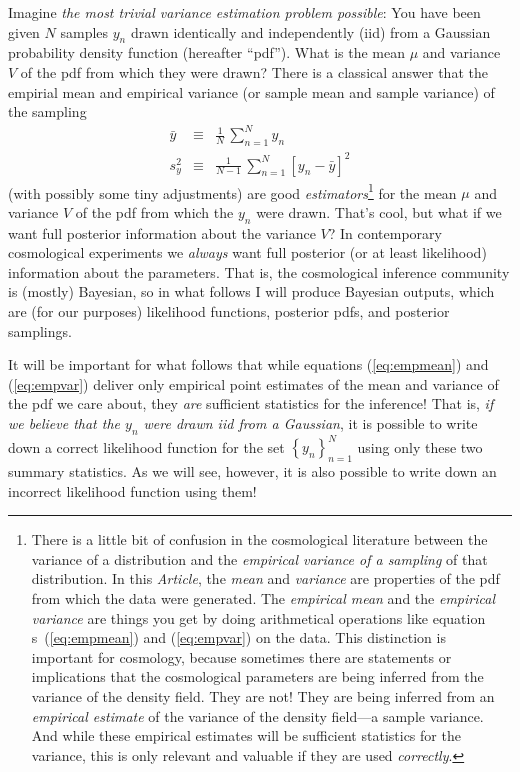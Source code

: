\documentclass[12pt, letterpaper, preprint]{aastex}
\newcommand{\setof}[1]{\left\{{#1}\right\}}
\newcommand{\documentname}{\textsl{Article}}
\newcommand{\equationname}{equation}
\begin{document}
Imagine \emph{the most trivial variance estimation problem possible}:
You have been given $N$ samples $y_n$ drawn identically and independently (iid)
from a Gaussian probability density function (hereafter ``pdf'').
What is the mean $\mu$ and variance $V$ of the pdf from which they
were drawn?
There is a classical answer that the empirial mean and empirical
variance (or sample mean and sample variance) of the sampling
\begin{eqnarray}
\bar{y} &\equiv& \frac{1}{N}\,\sum_{n=1}^N y_n
\label{eq:empmean}\\
s^2_y &\equiv& \frac{1}{N-1}\,\sum_{n=1}^N [y_n - \bar{y}]^2
\label{eq:empvar}
\end{eqnarray}
(with possibly some tiny adjustments) are good
\emph{estimators}\footnote{There is a little bit of confusion in the
  cosmological literature between the variance of a distribution and
  the \emph{empirical variance of a sampling} of that distribution. In this
  \documentname, the \emph{mean} and \emph{variance} are properties of
  the pdf from which the data were generated. The \emph{empirical
    mean} and the \emph{empirical variance} are things you get by
  doing arithmetical operations like \equationname
  s~(\ref{eq:empmean}) and (\ref{eq:empvar}) on the data.  This
  distinction is important for cosmology, because sometimes there are
  statements or implications that the cosmological parameters are
  being inferred from the variance of the density field. They are not!
  They are being inferred from an \emph{empirical estimate} of the
  variance of the density field---a sample variance. And while these empirical estimates
  will be sufficient statistics for the variance,
  this is only relevant and valuable if
  they are used \emph{correctly}.} for the mean $\mu$ and variance $V$ of the
pdf from which the $y_n$ were drawn.
That's cool, but what if we want full posterior information about the
variance $V$?
In contemporary cosmological experiments we \emph{always} want full
posterior (or at least likelihood) information about the parameters.
That is, the cosmological inference community is (mostly) Bayesian,
so in what follows I will produce Bayesian outputs, which are (for
our purposes) likelihood functions, posterior pdfs, and posterior
samplings.

It will be important for what follows that while equations
(\ref{eq:empmean}) and (\ref{eq:empvar}) deliver only empirical
point estimates of the mean and variance of the pdf we care about,
they \emph{are} sufficient statistics for the inference!
That is, \emph{if we believe that the $y_n$ were drawn iid from a
  Gaussian}, it is possible to write down a correct likelihood
function for the set $\setof{y_n}_{n=1}^N$ using only these two
summary statistics.
As we will see, however, it is also possible to write down an
incorrect likelihood function using them!
\end{document}
